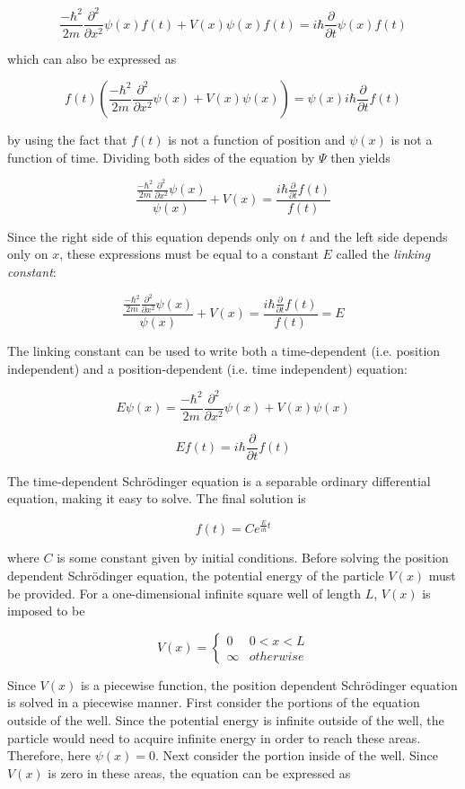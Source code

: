\documentclass[11pt]{article}
\begin{document}
$$
\frac{-\hbar^2}{2m}\frac{\partial^2}{\partial x^2} \psi(x)f(t)+V(x)\psi(x)f(t) = i\hbar \frac{\partial}{\partial t} \psi(x)f(t)
$$

\noindent which can also be expressed as

$$
f(t)\left(\frac{-\hbar^2}{2m}\frac{\partial^2}{\partial x^2}\psi(x)+V(x)\psi(x)\right) = \psi(x)i\hbar \frac{\partial}{\partial t}f(t)
$$

\noindent by using the fact that $f(t)$ is not a function of position and $\psi(x)$ is not a function of time. Dividing both sides of the equation by $\Psi$ then yields

$$
\frac{\frac{-\hbar^2}{2m}\frac{\partial^2}{\partial x^2}\psi(x)}{\psi(x)}+V(x) = \frac{i\hbar \frac{\partial}{\partial t}f(t)}{f(t)}
$$

Since the right side of this equation depends only on $t$ and the left side depends only on $x$, these expressions must be equal to a constant $E$ called the \emph{linking constant}:

$$
\frac{\frac{-\hbar^2}{2m}\frac{\partial^2}{\partial x^2}\psi(x)}{\psi(x)}+V(x) = \frac{i\hbar \frac{\partial}{\partial t}f(t)}{f(t)} = E
$$

The linking constant can be used to write both a time-dependent (i.e. position independent) and a position-dependent (i.e. time independent) equation:

$$
E \psi(x) = \frac{-\hbar^2}{2m}\frac{\partial^2}{\partial x^2}\psi(x) + V(x)\psi(x)
$$

$$
Ef(t) = i\hbar \frac{\partial}{\partial t}f(t)
$$

The time-dependent Schr\"odinger equation is a separable ordinary differential equation, making it easy to solve. The final solution is

$$
f(t) = Ce^{\frac{E}{i \hbar}t}
$$

\noindent where $C$ is some constant given by initial conditions. Before solving the position dependent Schr\"odinger equation, the potential energy of the particle $V(x)$ must be provided. For a one-dimensional infinite square well of length $L$, $V(x)$ is imposed to be

\[  V(x) =  \left\{
\begin{array}{ll}
      0 & 0 < x < L\\
      \infty & otherwise
      
\end{array} 
\right. \]

Since $V(x)$ is a piecewise function, the position dependent Schr\"odinger equation is solved in a piecewise manner. First consider the portions of the equation outside of the well. Since the potential energy is infinite outside of the well, the particle would need to acquire infinite energy in order to reach these areas. Therefore, here $\psi(x) = 0$. Next consider the portion inside of the well. Since $V(x)$ is zero in these areas, the equation can be expressed as
\end{document}
